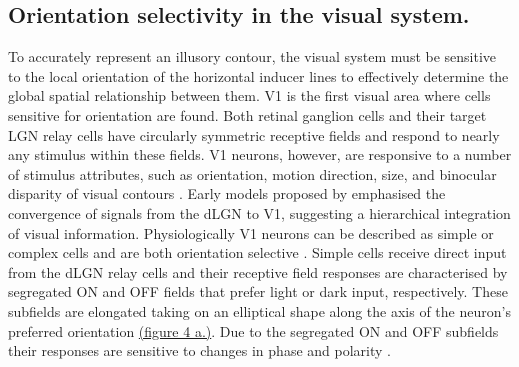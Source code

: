 \documentclass[12pt]{article}
\begin{document}


\subsection{Orientation selectivity in the visual system.}
To accurately represent an illusory contour, the visual system must be sensitive to the local orientation of the horizontal inducer lines to effectively determine the global spatial relationship between them. V1 is the first visual area where cells sensitive for orientation are found. Both retinal ganglion cells and their target LGN relay cells have circularly symmetric receptive fields and respond to nearly any stimulus within these fields. V1 neurons, however, are responsive to a number of stimulus attributes, such as orientation, motion direction, size, and binocular disparity of visual contours \autocite{hubelReceptiveFieldsBinocular1962}. 
Early models proposed by \textcite{hubelReceptiveFieldsBinocular1962} emphasised the convergence of signals from the dLGN to V1, suggesting a hierarchical integration of visual information. Physiologically V1 neurons can be described as simple or complex cells and are both orientation selective \autocite{skottunClassifyingSimpleComplex1991}. Simple cells receive direct input from the dLGN relay cells and their receptive field responses are characterised by segregated ON and OFF fields that prefer light or dark input, respectively. These subfields are elongated taking on an elliptical shape along the axis of the neuron's preferred orientation \hyperref[fig:LIF_Overview]{(figure 4 a.)}. Due to the segregated ON and OFF subfields their responses are sensitive to changes in phase and polarity \autocite{mechlerClassificationSimpleComplex2002}. 
\end{document}
